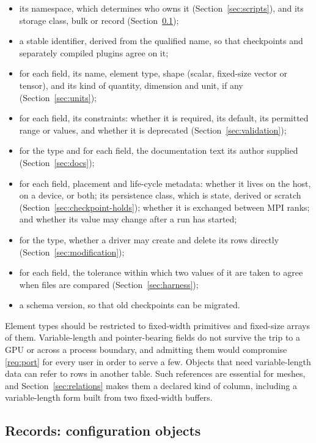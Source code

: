 \documentclass[11pt,a4paper]{article}
\begin{document}
\begin{itemize}
  \item its namespace, which determines who owns it
        (Section~\ref{sec:scripts}), and its storage class, bulk or record
        (Section~\ref{sec:records});
  \item a stable identifier, derived from the qualified name, so that
        checkpoints and separately compiled plugins agree on it;
  \item for each field, its name, element type, shape (scalar, fixed-size
        vector or tensor), and its kind of quantity, dimension and unit, if
        any (Section~\ref{sec:units});
  \item for each field, its constraints: whether it is required, its
        default, its permitted range or values, and whether it is deprecated
        (Section~\ref{sec:validation});
  \item for the type and for each field, the documentation text its author
        supplied (Section~\ref{sec:docs});
  \item for each field, placement and life-cycle metadata: whether it lives
        on the host, on a device, or both; its persistence class, which is
        state, derived or scratch (Section~\ref{sec:checkpoint-holds});
        whether it is exchanged between MPI ranks; and whether its value may
        change after a run has started;
  \item for the type, whether a driver may create and delete its rows
        directly (Section~\ref{sec:modification});
  \item for each field, the tolerance within which two values of it are
        taken to agree when files are compared (Section~\ref{sec:harness});
  \item a schema version, so that old checkpoints can be migrated.
\end{itemize}

Element types should be restricted to fixed-width primitives and fixed-size
arrays of them.  Variable-length and pointer-bearing fields do not survive the
trip to a GPU or across a process boundary, and admitting them would
compromise \ref{req:port} for every user in order to serve a few.  Objects
that need variable-length data can refer to rows in another table.  Such
references are essential for meshes, and Section~\ref{sec:relations} makes
them a declared kind of column, including a variable-length form built from
two fixed-width buffers.

\subsection{Records: configuration objects}
\label{sec:records}
\end{document}
